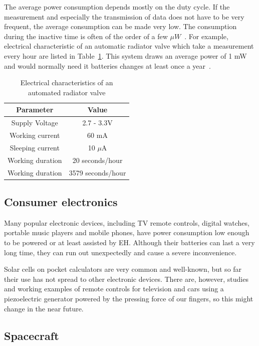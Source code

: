 \documentclass[a4paper,10pt]{article}
\begin{document}
The average power consumption depends mostly on the duty cycle. If the measurement and especially the transmission of data does not have to be very frequent, the average consumption can be made very low. The consumption during the inactive time is often of the order of a few $\mu W$~\cite{Salerno10}. For example, electrical characteristic of an automatic radiator valve which take a measurement every hour are listed in Table~\ref{tab:zbarv}. This system draws an average power of 1 mW and would normally need it batteries changes at least once a year~\cite{teg-wsn-ieee}. 

\begin{table}[h]
  \centering
  \begin{tabular}{|c|c|}
\hline
    Parameter & Value \\
\hline
Supply Voltage & 2.7 - 3.3V \\
Working current & 60 mA \\
Sleeping current & 10 $\mu$A \\
Working duration & 20 seconds/hour \\
Working duration & 3579 seconds/hour \\
\hline
  \end{tabular}
\caption{Electrical characteristics of an automated radiator valve}
\label{tab:zbarv}
\end{table}

\subsection{Consumer electronics}

Many popular electronic devices, including TV remote controls, digital watches, portable music players and mobile phones, have power consumption low enough to be powered or at least assisted by \ac{EH}. Although their batteries can last a very long time, they can run out unexpectedly and cause a severe inconvenience. 

Solar cells on pocket calculators are very common and well-known, but so far their use has not spread to other electronic devices. There are, however, studies and working examples of remote controls for television and cars using a piezoelectric generator powered by the pressing force of our fingers, so this might change in the near future. 

\subsection{Spacecraft}
\end{document}

